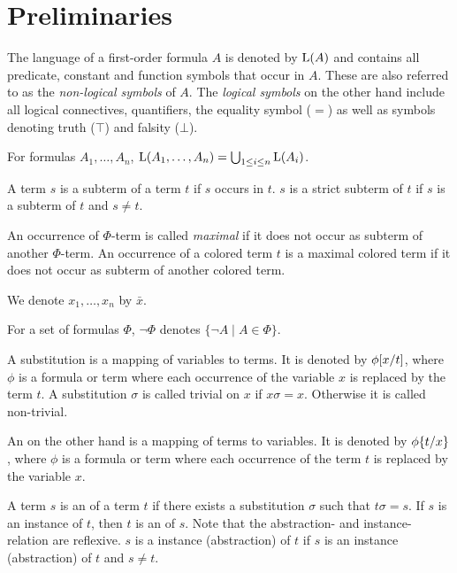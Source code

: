 \section{Preliminaries}

The language of a first-order formula $A$ is denoted by $\operatorname{L}(A)$ and contains all predicate, constant and function symbols that occur in $A$.
These are also referred to as the \emph{\mbox{non-logical} symbols} of $A$.
The \emph{logical symbols} on the other hand include all logical connectives, quantifiers, the equality symbol ($=$) as well as symbols denoting truth ($\top$) and falsity ($\bot$).

For formulas $A_1, \ldots, A_n$, $\operatorname{L}(A_1, \ldots, A_n) = \bigcup_{1\leq i \leq n} \operatorname{L}(A_i)$.

A term $s$ is a subterm of a term $t$ if $s$ occurs in $t$. $s$ is a strict subterm of $t$ if $s$ is a subterm of $t$ and $s \neq t$.

An occurrence of $\Phi$-term is called \emph{maximal} if it does not occur as subterm of another $\Phi$-term.
An occurrence of a colored term $t$ is a maximal colored term if it does not occur as subterm of another colored term.


We denote $x_1, \ldots, x_n$ by $\bar x$.

For a set of formulas $\Phi$, $\lnot \Phi$ denotes $\{\lnot A \mid A \in \Phi\}$.

A substitution is a mapping of variables to terms. It is denoted by $\phi[x/t]$, where $\phi$ is a formula or term where each occurrence of the variable $x$ is replaced by the term $t$.
A substitution $\sigma$ is called trivial on $x$ if $x\sigma = x$. Otherwise it is called non-trivial.

An  on the other hand is a mapping of terms to variables. It is denoted by $\phi\{t/x\}$, where $\phi$ is a formula or term where each occurrence of the term $t$ is replaced by the variable $x$.

A term $s$ is an  of a term $t$ if there exists a substitution $\sigma$ such that $t\sigma = s$.
If $s$ is an instance of $t$, then $t$ is an  of $s$. Note that the abstraction- and instance-relation are reflexive. 
$s$ is a  instance (abstraction) of $t$ if $s$ is an instance (abstraction) of $t$ and $s\neq t$.

